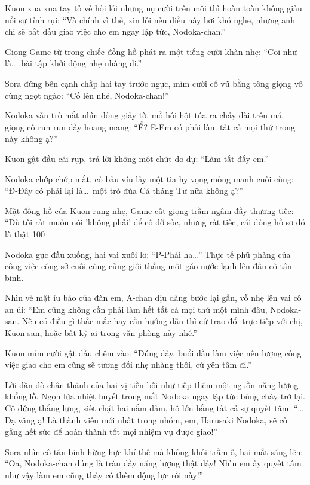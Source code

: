 \documentclass[../main.tex]{subfiles}
\begin{document}
Kuon xua xua tay tỏ vẻ hối lỗi nhưng nụ cười trên môi thì hoàn toàn không giấu nổi sự tỉnh rụi: ``Và chính vì thế, xin lỗi nếu điều này hơi khó nghe, nhưng anh chị sẽ bắt đầu giao việc cho em ngay lập tức, Nodoka-chan.''

Giọng Game từ trong chiếc đồng hồ phát ra một tiếng cười khàn nhẹ: ``Coi như là\dots\ bài tập khởi động nhẹ nhàng đi.''

Sora đứng bên cạnh chắp hai tay trước ngực, mỉm cười cổ vũ bằng tông giọng vô cùng ngọt ngào: ``Cố lên nhé, Nodoka-chan!''

Nodoka vẫn trố mắt nhìn đống giấy tờ, mồ hôi hột túa ra chảy dài trên má, giọng cô run run đầy hoang mang: ``Ể? E-Em có phải làm tất cả mọi thứ trong này không ạ?''

Kuon gật đầu cái rụp, trả lời không một chút do dự: ``Làm tất đấy em.''

Nodoka chớp chớp mắt, cố bấu víu lấy một tia hy vọng mỏng manh cuối cùng: ``Đ-Đây có phải lại là\dots\ một trò đùa Cá tháng Tư nữa không ạ?''

Mặt đồng hồ của Kuon rung nhẹ, Game cất giọng trầm ngâm đầy thương tiếc: ``Dù tôi rất muốn nói 'không phải' để cô đỡ sốc, nhưng rất tiếc, cái đống hồ sơ đó là thật 100%

Nodoka gục đầu xuống, hai vai xuôi lơ: ``P-Phải ha\dots'' Thực tế phũ phàng của công việc công sở cuối cùng cũng giội thẳng một gáo nước lạnh lên đầu cô tân binh.

Nhìn vẻ mặt ỉu bảo của đàn em, A-chan dịu dàng bước lại gần, vỗ nhẹ lên vai cô an ủi: ``Em cũng không cần phải làm hết tất cả mọi thứ một mình đâu, Nodoka-san. Nếu có điều gì thắc mắc hay cần hướng dẫn thì cứ trao đổi trực tiếp với chị, Kuon-san, hoặc bất kỳ ai trong văn phòng này nhé.''

Kuon mỉm cười gật đầu chêm vào: ``Đúng đấy, buổi đầu làm việc nên lượng công việc giao cho em cũng sẽ tương đối nhẹ nhàng thôi, cứ yên tâm đi.''

Lời dặn dò chân thành của hai vị tiền bối như tiếp thêm một nguồn năng lượng khổng lồ. Ngọn lửa nhiệt huyết trong mắt Nodoka ngay lập tức bùng cháy trở lại. Cô đứng thẳng lưng, siết chặt hai nắm đấm, hô lớn bằng tất cả sự quyết tâm: ``\dots Dạ vâng ạ! Là thành viên mới nhất trong nhóm, em, Harusaki Nodoka, sẽ cố gắng hết sức để hoàn thành tốt mọi nhiệm vụ được giao!''

Sora nhìn cô tân binh hừng hực khí thế mà không khỏi trầm ồ, hai mắt sáng lên: ``Oa, Nodoka-chan đúng là tràn đầy năng lượng thật đấy! Nhìn em ấy quyết tâm như vậy làm em cũng thấy có thêm động lực rồi này!''
\end{document}

